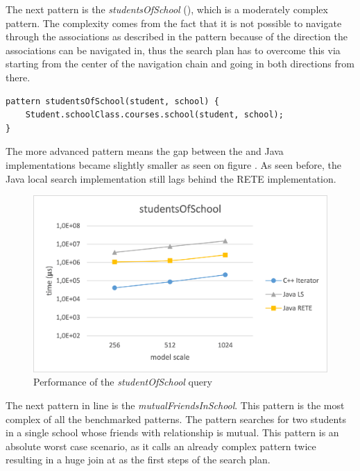 The next pattern is the \emph{studentsOfSchool}
(), which is a moderately complex pattern. The
complexity comes from the fact that it is not possible to navigate through the
associations as described in the pattern because of the direction the
associations can be navigated in, thus the search plan has to overcome this via
starting from the center of the navigation chain and going in both directions
from there.

\begin{lstlisting}[frame=single,float=!ht,language=IQPL,
label=listing:meas_studentOfSchool, caption=The studentOfSchool pattern]
pattern studentsOfSchool(student, school) {
	Student.schoolClass.courses.school(student, school);
}
\end{lstlisting}

The more advanced pattern means the gap between the \CPP{} and Java
implementations became slightly smaller as seen on figure
. As seen before, the Java local search
implementation still lags behind the RETE implementation.

\begin{figure}[!ht]
\centering
\includegraphics[width=120mm,
keepaspectratio]{figures/meas_studentOfSchool.png}
\caption{Performance of the \emph{studentOfSchool} query}
\label{fig:meas_studentOfSchool}
\end{figure}

The next pattern in line is the \emph{mutualFriendsInSchool}. This pattern is
the most complex of all the benchmarked patterns. The pattern searches for
two students in a single school whose friends with relationship is mutual. This
pattern is an absolute worst case scenario, as it calls an already complex
pattern twice resulting in a huge join at as the first steps of the search plan.


